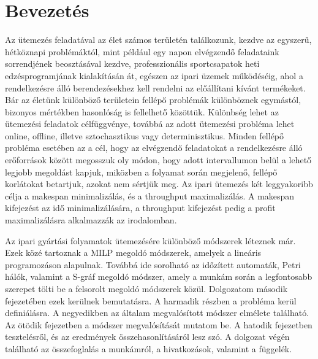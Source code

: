 \chapter{Bevezetés}
Az ütemezés feladatával az élet számos területén találkozunk, kezdve az egyszerű, hétköznapi problémáktól, mint például egy napon elvégzendő feladataink sorrendjének beosztásával kezdve, professzionális sportcsapatok heti edzésprogramjának kialakításán át, egészen az ipari üzemek működéséig, ahol a rendelkezésre álló berendezésekhez kell rendelni az előállítani kívánt termékeket. Bár az életünk különböző területein fellépő problémák különböznek egymástól, bizonyos mértékben hasonlóság is fellelhető közöttük. Különbség lehet az ütemezési feladatok célfüggvénye, továbbá az adott ütemezési probléma lehet online, offline, illetve sztochasztikus vagy determinisztikus. Minden fellépő probléma esetében az a cél, hogy az elvégzendő feladatokat a rendelkezésre álló erőforrások között megosszuk oly módon, hogy adott intervallumon belül a lehető legjobb megoldást kapjuk, miközben a folyamat során megjelenő, fellépő korlátokat betartjuk, azokat nem sértjük meg. Az ipari ütemezés két leggyakoribb célja a makespan minimalizálás, és a throughput maximalizálás. A makespan kifejezést az idő minimalizálására, a throughput kifejezést pedig a profit maximalizálásra alkalmazzák az irodalomban.

Az ipari gyártási folyamatok ütemezésére különböző módszerek léteznek már. Ezek közé tartoznak a MILP megoldó módszerek, amelyek a lineáris programozáson alapulnak. Továbbá ide sorolható az időzített automaták, Petri hálók, valamint a S-gráf megoldó módszer, amely a munkám során a legfontosabb szerepet tölti be a felsorolt megoldó módszerek közül. Dolgozatom második fejezetében ezek kerülnek bemutatásra. A harmadik részben a probléma kerül definiálásra. A negyedikben az általam megvalósított módszer elmélete található. Az ötödik fejezetben a módszer megvalósítását mutatom be. A hatodik fejezetben tesztelésről, és az eredmények összehasonlításáról lesz szó. A dolgozat végén található az összefoglalás a munkámról, a hivatkozások, valamint a függelék.